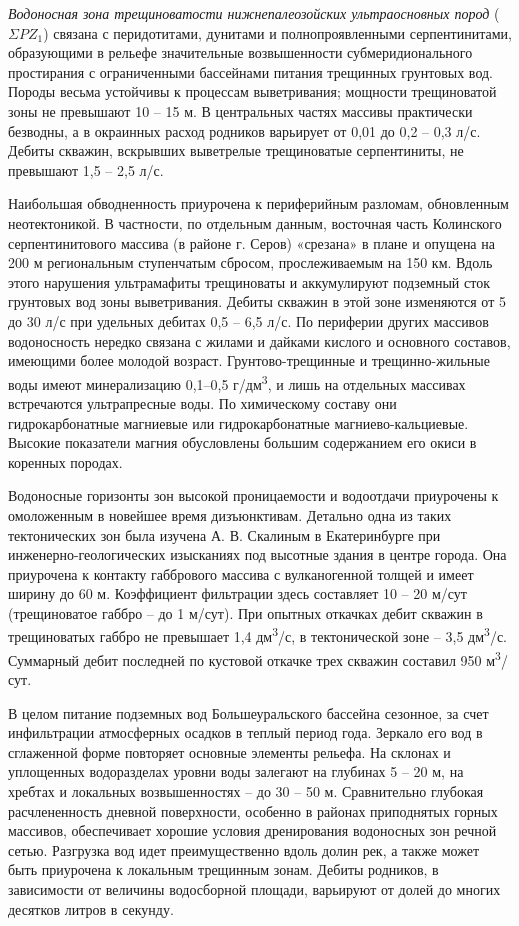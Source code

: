 \documentclass[a4paper,12pt]{article} %
\begin{document}
\textit{Водоносная зона трещиноватости нижнепалеозойских ультраосновных пород} ($\Sigma PZ_1$)
связана с перидотитами, дунитами и полнопроявленными серпентинитами, образующими в рельефе значительные возвышенности субмеридионального простирания с ограниченными бассейнами питания трещинных грунтовых вод. Породы весьма устойчивы к процессам выветривания; мощности трещиноватой зоны не превышают 10 – 15 м. В центральных частях массивы практически безводны, а в окраинных расход родников варьирует от 0,01 до 0,2 – 0,3 л/с. Дебиты скважин, вскрывших выветрелые трещиноватые серпентиниты, не превышают 1,5 – 2,5 л/с.

Наибольшая обводненность приурочена к периферийным разломам, обновленным неотектоникой. В частности, по отдельным данным, восточная часть Колинского серпентинитового массива (в районе г. Серов) «срезана» в плане и опущена на 200 м региональным ступенчатым сбросом, прослеживаемым на 150 км. Вдоль этого нарушения ультрамафиты трещиноваты и аккумулируют подземный сток грунтовых вод зоны выветривания. Дебиты
скважин в этой зоне изменяются от 5 до 30 л/с при удельных дебитах 0,5 – 6,5 л/с. По периферии других массивов водоносность нередко связана с жилами и дайками кислого и основного составов, имеющими более молодой возраст. Грунтово-трещинные и трещинно-жильные воды имеют минерализацию 0,1–0,5 г/дм\textsuperscript{3}, и лишь на отдельных массивах встречаются ультрапресные воды. По химическому составу они гидрокарбонатные магниевые или гидрокарбонатные магниево-кальциевые. Высокие показатели магния обусловлены большим содержанием его окиси в коренных породах.

Водоносные горизонты зон высокой проницаемости и водоотдачи приурочены к омоложенным в новейшее время дизъюнктивам. Детально одна из таких тектонических зон была изучена А. В. Скалиным в Екатеринбурге
при инженерно-геологических изысканиях под высотные здания в центре города. Она приурочена к контакту габбрового массива с вулканогенной толщей и имеет ширину до 60 м. Коэффициент фильтрации здесь составляет 10 – 20 м/сут (трещиноватое габбро – до 1 м/сут). При опытных откачках дебит скважин в трещиноватых габбро не превышает 1,4 дм\textsuperscript{3}/с, в тектонической зоне – 3,5 дм\textsuperscript{3}/с. Суммарный дебит последней по кустовой откачке трех скважин составил 950 м\textsuperscript{3}/сут.

В целом питание подземных вод Большеуральского бассейна сезонное, за счет инфильтрации атмосферных осадков в теплый период года. Зеркало его вод в сглаженной форме повторяет основные элементы рельефа. На
склонах и уплощенных водоразделах уровни воды залегают на глубинах 5 – 20 м, на хребтах и локальных возвышенностях – до 30 – 50 м. Сравнительно глубокая расчлененность дневной поверхности, особенно в районах приподнятых горных массивов, обеспечивает хорошие условия дренирования водоносных зон речной сетью. Разгрузка вод идет преимущественно вдоль долин рек, а также может быть приурочена к локальным трещинным зонам. Дебиты родников, в зависимости от величины водосборной площади, варьируют от долей до многих десятков литров в секунду.
\end{document}
